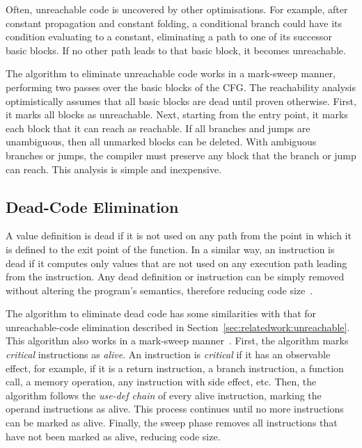 Often, unreachable code is uncovered by other optimisations.
For example, after constant propagation and constant folding, a conditional branch could have its condition evaluating to a constant, eliminating a path to one of its successor basic blocks.
If no other path leads to that basic block, it becomes unreachable.

The algorithm to eliminate unreachable code works in a mark-sweep manner, performing two passes over the basic blocks of the CFG.
The reachability analysis optimistically assumes that all basic blocks are dead until proven otherwise.
First, it marks all blocks as unreachable.
Next, starting from the entry point, it marks each block that it can reach as reachable.
If all branches and jumps are unambiguous, then all unmarked blocks can be deleted.
With ambiguous branches or jumps, the compiler must preserve any block that the branch or jump can reach.
This analysis is simple and inexpensive.

\subsection{Dead-Code Elimination} \label{sec:relatedwork:dce}

A value definition is dead if it is not used on any path from the point in which it is defined to the exit point of the function.
In a similar way, an instruction is dead if it computes only values that are not used on any execution path leading from the instruction.
Any dead definition or instruction can be simply removed without altering the program's semantics, therefore reducing code size~\cite{muchnick98}.

The algorithm to eliminate dead code has some similarities with that for unreachable-code elimination described in Section~\ref{sec:relatedwork:unreachable}.
This algorithm also works in a mark-sweep manner~\cite{cooper07}.
First, the algorithm marks \textit{critical} instructions as \textit{alive}.
An instruction is \textit{critical} if it has an observable effect, for example, if it is a return instruction, a branch instruction, a function call, a memory operation, any instruction with side effect, etc.
Then, the algorithm follows the \textit{use-def chain} of every alive instruction, marking the operand instructions as alive.
This process continues until no more instructions can be marked as alive.
Finally, the sweep phase removes all instructions that have not been marked as alive, reducing code size.


